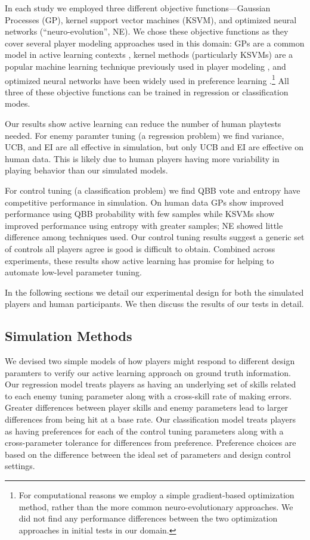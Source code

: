 \documentclass{sig-alternate}
\begin{document}
In each study we employed three different objective functions---Gaussian Processes (GP), kernel support vector machines (KSVM), and optimized neural networks (``neuro-evolution'', NE).
We chose these objective functions as they cover several player modeling approaches used in this domain: GPs are a common model in active learning contexts \cite{brochu2010:thesis}, kernel methods (particularly KSVMs) are a popular machine learning technique previously used in player modeling \cite{yu2011:minboredom}, and optimized neural networks have been widely used in preference learning \cite{yannakakis2011:edpcg}.\footnote{For computational reasons we employ a simple gradient-based optimization method, rather than the more common neuro-evolutionary approaches. We did not find any performance differences between the two optimization approaches in initial tests in our domain.}
All three of these objective functions can be trained in regression or classification modes.

Our results show active learning can reduce the number of human playtests needed.
For enemy paramter tuning (a regression problem) we find variance, UCB, and EI are all effective in simulation, but only UCB and EI are effective on human data.
This is likely due to human players having more variability in playing behavior than our simulated models.

For control tuning (a classification problem) we find QBB vote and entropy have competitive performance in simulation.
On human data GPs show improved performance using QBB probability with few samples while KSVMs show improved performance using entropy with greater samples; NE showed little difference among techniques used.
Our control tuning results suggest a generic set of controls all players agree is good is difficult to obtain.
Combined across experiments, these results show active learning has promise for helping to automate low-level parameter tuning.

In the following sections we detail our experimental design for both the simulated players and human participants.
We then discuss the results of our tests in detail.


\subsection{Simulation Methods}
We devised two simple models of how players might respond to different design paramters to verify our active learning approach on ground truth information.
Our regression model treats players as having an underlying set of skills related to each enemy tuning parameter along with a cross-skill rate of making errors.
Greater differences between player skills and enemy parameters lead to larger differences from being hit at a base rate.
Our classification model treats players as having preferences for each of the control tuning parameters along with a cross-parameter tolerance for differences from preference.
Preference choices are based on the difference between the ideal set of parameters and design control settings.
\end{document}
